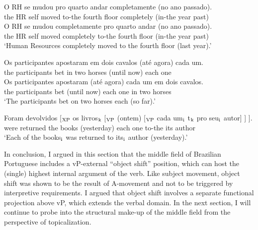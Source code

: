 \documentclass[output=paper]{langscibook}
\begin{document}
\begin{exe}
\ex \label{lacerda15}
\begin{xlist}
\ex \label{lacerda15a}
\gll O 	RH 	se 	mudou 	pro 	quarto	andar 	completamente	(no 	ano 	passado).\\
the 	HR 	self	moved	to-the	fourth	floor	completely 	(in-the	year	past)\\


\ex \label{lacerda15b}
\gll O 	RH 	se 	mudou 	completamente 	pro 	quarto	andar 	(no 	ano 	passado).\\
the 	HR 	self	moved	completely	to-the	fourth	floor	(in-the	year	past)\\
\glt‘Human Resources completely moved to the fourth floor (last year).’\\
\end{xlist}

\ex \label{lacerda16}
\begin{xlist}
\ex \label{lacerda16a}
\gll Os 	participantes 	apostaram 	em 	dois 	cavalos 	(até 	agora) 	cada 	um.\\
the	participants	bet	in	two	horses	(until	now)	each	one\\

\ex \label{lacerda16b}
\gll Os 	participantes 	apostaram 	(até 	agora) 	cada 	um	em 	dois 	cavalos.\\
the	participants	bet	(until	now)	each	one	in	two	horses\\
\glt‘The participants bet on two horses each (so far).’\\
\end{xlist}

\ex \label{lacerda17}
\gll Foram 	devolvidos [$_{\textnormal{XP}}$ os 	livros$_{\textnormal{k}}$ [$_{\textnormal{VP}}$ (ontem) 	[$_{\textnormal{VP}}$ cada 	um$_{\textnormal{i}}$ t$_{\textnormal{k}}$	pro 	seu$_{\textnormal{i}}$ 	autor] ] ].\\
were returned 	{}	the 	books 	{}	(yesterday) {}	each one {}	to-the	its 	author\\
\glt‘Each of the books$_{\textnormal{i}}$ was returned to its$_{\textnormal{i}}$ author (yesterday).’
\end{exe}

In conclusion, I argued in this section that the middle field of Brazilian Portuguese includes a vP-external “object shift” position, which can host the (single) highest internal argument of the verb. Like subject movement, object shift was shown to be the result of A-movement and not to be triggered by interpretive requirements. I argued that object shift involves a separate functional projection above vP, which extends the verbal domain. In the next section, I will continue to probe into the structural make-up of the middle field from the perspective of topicalization.
\end{document}
